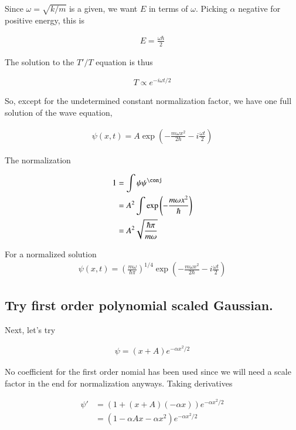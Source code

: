 \documentclass{article}
\begin{document}
Since $\omega = \sqrt{k/m}$ is a given, we want $E$ in terms of $\omega$.  Picking $\alpha$ negative for positive energy, this is

\begin{align*}
E = \frac{ \omega \hbar }{ 2 } 
\end{align*}

The solution to the $T'/T$ equation is thus

\begin{align*}
T \propto e^{-i \omega t/2}
\end{align*}

So, except for the undetermined constant normalization factor, we have one full solution of the wave equation, 

\begin{align*}
\psi(x,t) = A \exp\left( - \frac{m \omega x^2 }{2 \hbar} - i \frac{\omega t}{2} \right)
\end{align*}

The normalization

\begin{align*}
1 
&= \int \psi \psi^\conj \\
&= A^2 \int \exp\left( - \frac{m \omega x^2 }{\hbar} \right) \\
&= A^2 \sqrt{ \frac{\hbar \pi}{ m \omega } }
\end{align*}

For a normalized solution
\begin{align}
\psi(x,t) = \left( 
\frac{ m \omega }{\hbar \pi}
\right)^{1/4} \exp\left( - \frac{m \omega x^2 }{2 \hbar} - i \frac{\omega t}{2} \right)
\end{align}

\subsection{ Try first order polynomial scaled Gaussian. }

Next, let's try 

\begin{align*}
\psi = (x + A) e^{-\alpha x^2/2}
\end{align*}

No coefficient for the first order nomial has been used since we will need a scale factor in the end for normalization anyways.  Taking derivatives

\begin{align*}
\psi' 
&= (1 + (x + A)(-\alpha x)) e^{-\alpha x^2/2} \\
&= (1 - \alpha A x - \alpha x^2 ) e^{-\alpha x^2/2} \\
\end{align*}
\end{document}
